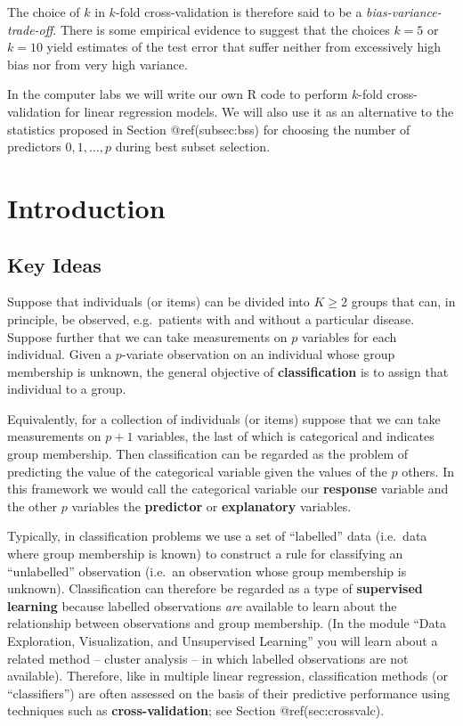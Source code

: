 \documentclass[
]{article}
\begin{document}
The choice of \(k\) in \(k\)-fold cross-validation is therefore said to
be a \emph{bias-variance-trade-off}. There is some empirical evidence to
suggest that the choices \(k=5\) or \(k=10\) yield estimates of the test
error that suffer neither from excessively high bias nor from very high
variance.

In the computer labs we will write our own R code to perform \(k\)-fold
cross-validation for linear regression models. We will also use it as an
alternative to the statistics proposed in Section @ref(subsec:bss) for
choosing the number of predictors \(0,1,\ldots,p\) during best subset
selection.

\hypertarget{introduction}{%
\section{Introduction}\label{introduction}}

\hypertarget{key-ideas}{%
\subsection{Key Ideas}\label{key-ideas}}

Suppose that individuals (or items) can be divided into \(K \ge 2\)
groups that can, in principle, be observed, e.g.~patients with and
without a particular disease. Suppose further that we can take
measurements on \(p\) variables for each individual. Given a
\(p\)-variate observation on an individual whose group membership is
unknown, the general objective of \textbf{classification} is to assign
that individual to a group.

Equivalently, for a collection of individuals (or items) suppose that we
can take measurements on \(p+1\) variables, the last of which is
categorical and indicates group membership. Then classification can be
regarded as the problem of predicting the value of the categorical
variable given the values of the \(p\) others. In this framework we
would call the categorical variable our \textbf{response} variable and
the other \(p\) variables the \textbf{predictor} or \textbf{explanatory}
variables.

Typically, in classification problems we use a set of ``labelled'' data
(i.e.~data where group membership is known) to construct a rule for
classifying an ``unlabelled'' observation (i.e.~an observation whose
group membership is unknown). Classification can therefore be regarded
as a type of \textbf{supervised learning} because labelled observations
\emph{are} available to learn about the relationship between
observations and group membership. (In the module ``Data Exploration,
Visualization, and Unsupervised Learning'' you will learn about a
related method -- cluster analysis -- in which labelled observations are
not available). Therefore, like in multiple linear regression,
classification methods (or ``classifiers'') are often assessed on the
basis of their predictive performance using techniques such as
\textbf{cross-validation}; see Section @ref(sec:crossvalc).
\end{document}
